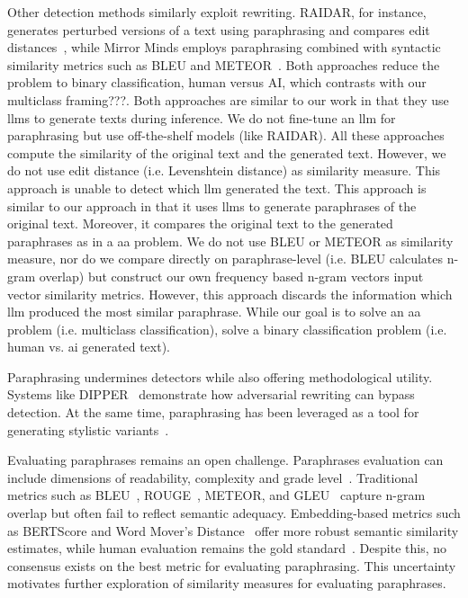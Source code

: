 Other detection methods similarly exploit rewriting. 
RAIDAR, for instance, generates perturbed versions of a text using paraphrasing and compares edit distances~\citep{mao_raidar_2024}, while Mirror Minds employs paraphrasing combined with syntactic similarity metrics such as BLEU and METEOR~\citep{baradia_mirror_2025}. 
Both approaches reduce the problem to binary classification, human versus AI, which contrasts with our multiclass framing???.
Both approaches are similar to our work in that they use \acp{llm} to generate texts during inference.
We do not fine-tune an \ac{llm} for paraphrasing but use off-the-shelf models (like RAIDAR).
All these approaches compute the similarity of the original text and the generated text.
However, we do not use edit distance (i.e. Levenshtein distance) as similarity measure.
This approach is unable to detect which \ac{llm} generated the text.
This approach is similar to our approach in that it uses \acp{llm} to generate paraphrases of the original text.
Moreover, it compares the original text to the generated paraphrases as in a \ac{aa} problem. %
We do not use BLEU or METEOR as similarity measure, nor do we compare directly on paraphrase-level (i.e. BLEU calculates n-gram overlap) 
but construct our own frequency based n-gram vectors input vector similarity metrics.
However, this approach discards the information which \ac{llm} produced the most similar paraphrase. 
While our goal is to solve an \ac{aa} problem (i.e. multiclass classification), 
\citet{baradia_mirror_2025} solve a binary classification problem (i.e. human vs. \ac{ai} generated text).


Paraphrasing undermines detectors while also offering methodological utility. 
Systems like DIPPER~\citep{Krishna_dipper_2023} demonstrate how adversarial rewriting can bypass detection. 
At the same time, paraphrasing has been leveraged as a tool for generating stylistic variants~\citep{mao_raidar_2024,baradia_mirror_2025}.

Evaluating paraphrases remains an open challenge. 
Paraphrases evaluation can include dimensions of readability, complexity and grade level~\citep{Thomas_cross_topic_24}.
Traditional metrics such as BLEU~\citep{papineni_bleu_2001}, ROUGE~\citep{lin_rouge_2004}, METEOR, and GLEU~\citep{kurt_pehlivanoglu_comparative_2024} capture n-gram overlap but often fail to reflect semantic adequacy. 
Embedding-based metrics such as BERTScore and Word Mover's Distance~\citep{gohsen_captions_2023} offer more robust semantic similarity estimates, while human evaluation remains the gold standard~\citep{zhou_paraphrase_2021}. 
Despite this, no consensus exists on the best metric for evaluating paraphrasing. 
This uncertainty motivates further exploration of similarity measures for evaluating paraphrases.



